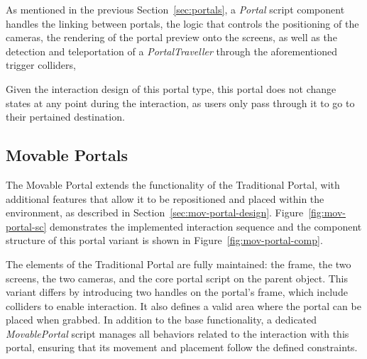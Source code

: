 As mentioned in the previous Section~\ref{sec:portals}, a \textit{Portal} script component handles the linking between portals, 
the logic that controls the positioning of the cameras, the rendering of the portal preview onto the screens, 
as well as the detection and teleportation of a \textit{PortalTraveller} through the aforementioned trigger colliders, 
    
Given the interaction design of this portal type, this portal does not change states at any point during the interaction, as users only 
pass through it to go to their pertained destination.
    
\subsection{Movable Portals}
\label{sec:mov-portals}

The Movable Portal extends the functionality of the Traditional Portal, with additional features that allow it to be repositioned and 
placed within the environment, as described in Section~\ref{sec:mov-portal-design}. Figure~\ref{fig:mov-portal-sc} demonstrates the implemented 
interaction sequence and the component structure of this portal variant is shown in Figure~\ref{fig:mov-portal-comp}.

The elements of the Traditional Portal are fully maintained: the frame, the two screens, the two cameras, and the core portal script 
on the parent object. This variant differs by introducing two handles on the portal's frame, which include colliders to enable interaction.
It also defines a valid area where the portal can be placed when grabbed. In addition to the base functionality, a dedicated
\textit{MovablePortal} script manages all behaviors related to the interaction with this portal, ensuring that its movement and placement 
follow the defined constraints.

